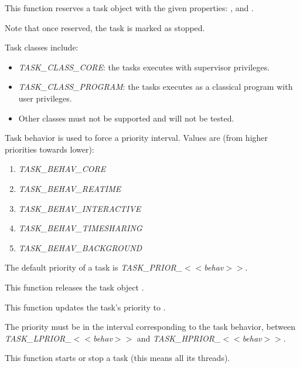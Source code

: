 \begin{itemize}
	 {
	   This function reserves a task object with the given
	   properties: ,  and
	   .

	   Note that once reserved, the task is marked as stopped.

	   Task classes include:

	   \begin{itemize}
	     \item
	       \emph{TASK\_CLASS\_CORE}: the tasks executes with
	       supervisor privileges.
	     \item
	       \emph{TASK\_CLASS\_PROGRAM}: the tasks executes as a
	       classical program with user privileges.
	     \item
	       Other classes must not be supported and will not be
	       tested.
	   \end{itemize}

	   Task behavior is used to force a priority interval. Values
	   are (from higher priorities towards lower):

	   \begin{enumerate}
	     \item \emph{TASK\_BEHAV\_CORE}
	     \item \emph{TASK\_BEHAV\_REATIME}
	     \item \emph{TASK\_BEHAV\_INTERACTIVE}
	     \item \emph{TASK\_BEHAV\_TIMESHARING}
	     \item \emph{TASK\_BEHAV\_BACKGROUND}
	   \end{enumerate}

	   The default priority of a task is
	   \emph{TASK\_PRIOR\_$<<$behav$>>$}.
	 }

	 {
	   This function releases the task object .
	 }

	 {
	   This function updates the task's priority to .

	   The priority must be in the interval corresponding to the
	   task behavior, between \emph{TASK\_LPRIOR\_$<<$behav$>>$} and
	   \emph{TASK\_HPRIOR\_$<<$behav$>>$}.
	 }

	 {
	   This function starts or stop a task (this means all its
	   threads).

}
\end{itemize}

